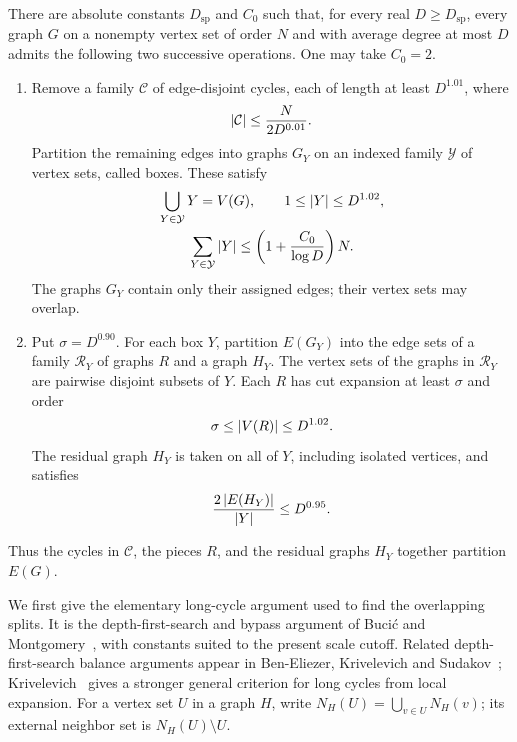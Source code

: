 \begin{lemma}\label{lem:scale-split}
There are absolute constants $D_{\mathrm{sp}}$ and $C_0$ such that, for
every real $D\ge D_{\mathrm{sp}}$, every graph $G$ on a nonempty vertex
set of order $N$ and with average degree at most $D$ admits the following
two successive operations.  One may take $C_0=2$.
\begin{enumerate}[label=\textup{(\roman*)}]
\item\label{item:scale-boxes}
Remove a family $\mathcal C$ of edge-disjoint cycles, each of length at
least $D^{1.01}$, where
\begin{equation}\label{eq:scale-cycle-cost}
  \left|\mathcal C\right|\le \frac{N}{2D^{0.01}}.
\end{equation}
Partition the remaining edges into graphs $G_Y$ on an indexed family
$\mathcal Y$ of vertex sets, called boxes.  These satisfy
\begin{equation}\label{eq:scale-box-order}
\begin{gathered}
  \bigcup_{Y\in\mathcal Y}Y=V(G),\qquad
  1\le \left|Y\right|\le D^{1.02},\\
  \sum_{Y\in\mathcal Y}\left|Y\right|
    \le \left(1+\frac{C_0}{\log D}\right)N.
\end{gathered}
\end{equation}
The graphs $G_Y$ contain only their assigned edges; their vertex sets
may overlap.

\item\label{item:scale-expanders}
Put $\sigma=D^{0.90}$.  For each box $Y$, partition $E(G_Y)$ into
the edge sets of a family $\mathcal R_Y$ of graphs $R$ and a graph $H_Y$.
The vertex sets of the graphs in $\mathcal R_Y$ are pairwise disjoint
subsets of $Y$.  Each $R$ has cut expansion at least $\sigma$ and order
\begin{equation}\label{eq:scale-piece-order}
  \sigma\le \left|V(R)\right|\le D^{1.02}.
\end{equation}
The residual graph $H_Y$ is taken on all of $Y$, including isolated
vertices, and satisfies
\begin{equation}\label{eq:scale-residual-degree}
  \frac{2\left|E(H_Y)\right|}{\left|Y\right|}\le D^{0.95}.
\end{equation}
\end{enumerate}
Thus the cycles in $\mathcal C$, the pieces $R$, and the residual graphs
$H_Y$ together partition $E(G)$.
\end{lemma}

We first give the elementary long-cycle argument used to find the
overlapping splits. It is the depth-first-search and bypass argument
of Buci\'c and Montgomery~\cite[Lemma~25]{BM2024}, with constants
suited to the present scale cutoff. Related depth-first-search balance
arguments appear in Ben-Eliezer, Krivelevich and
Sudakov~\cite[Lemma~2.3]{BKS2012}; Krivelevich~\cite[Theorem~1]{Krivelevich2019}
gives a stronger general criterion for long cycles from local expansion.
For a vertex set $U$ in a graph $H$, write
$N_H(U)=\bigcup_{v\in U}N_H(v)$; its external neighbor set is
$N_H(U)\setminus U$.

